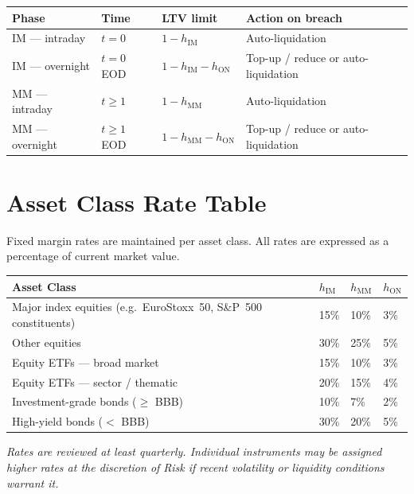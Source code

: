 \documentclass[9pt, a4paper]{extarticle}
\begin{document}
\begin{tabularx}{\linewidth}{lllX}
\toprule
\textbf{Phase} & \textbf{Time} & \textbf{LTV limit} & \textbf{Action on breach} \\
\midrule
IM — intraday   & $t = 0$     & $1 - h_{\mathrm{IM}}$                          & Auto-liquidation \\
IM — overnight  & $t = 0$ EOD & $1 - h_{\mathrm{IM}} - h_{\mathrm{ON}}$        & Top-up / reduce or auto-liquidation \\
MM — intraday   & $t \geq 1$  & $1 - h_{\mathrm{MM}}$                          & Auto-liquidation \\
MM — overnight  & $t \geq 1$ EOD & $1 - h_{\mathrm{MM}} - h_{\mathrm{ON}}$     & Top-up / reduce or auto-liquidation \\
\bottomrule
\end{tabularx}

\section{Asset Class Rate Table}
\label{sec:rates}

Fixed margin rates are maintained per asset class. All rates are expressed as a
percentage of current market value.

\begin{tabularx}{\linewidth}{lXXX}
\toprule
\textbf{Asset Class}
  & \textbf{$h_{\mathrm{IM}}$}
  & \textbf{$h_{\mathrm{MM}}$}
  & \textbf{$h_{\mathrm{ON}}$} \\
\midrule
Major index equities (e.g.\ EuroStoxx~50, S\&P~500 constituents) & 15\% & 10\% & 3\% \\
Other equities                                                     & 30\% & 25\% & 5\% \\
Equity ETFs — broad market                                         & 15\% & 10\% & 3\% \\
Equity ETFs — sector / thematic                                    & 20\% & 15\% & 4\% \\
Investment-grade bonds ($\geq$ BBB)                                & 10\% & 7\%  & 2\% \\
High-yield bonds ($<$ BBB)                                         & 30\% & 20\% & 5\% \\
\bottomrule
\end{tabularx}

\bigskip
\textit{Rates are reviewed at least quarterly. Individual instruments may be assigned
higher rates at the discretion of Risk if recent volatility or liquidity conditions
warrant it.}
\end{document}
